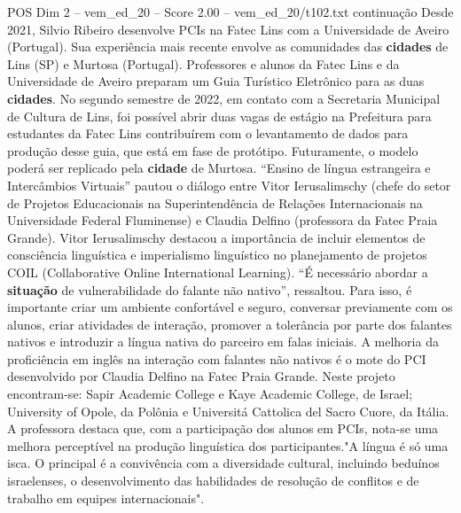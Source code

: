 \begin{textsample}{POS Dim 2 – vem\_ed\_20 – Score 2.00 – vem\_ed\_20/t102.txt}  \label{ex:f2_pos_104}
continuação Desde 2021, Silvio Ribeiro desenvolve PCIs na Fatec Lins com a Universidade de Aveiro (Portugal).
Sua experiência mais recente envolve as comunidades das \textbf{cidades} de Lins (SP) e Murtosa (Portugal).
Professores e alunos da Fatec Lins e da Universidade de Aveiro preparam um Guia Turístico Eletrônico para as duas \textbf{cidades}.
No segundo semestre de 2022, em contato com a Secretaria Municipal de Cultura de Lins, foi possível abrir duas vagas de estágio na Prefeitura para estudantes da Fatec Lins contribuírem com o levantamento de dados para produção desse guia, que está em fase de protótipo.
Futuramente, o modelo poderá ser replicado pela \textbf{cidade} de Murtosa. “Ensino de língua estrangeira e Intercâmbios Virtuais” pautou o diálogo entre Vitor Ierusalimschy (chefe do setor de Projetos Educacionais na Superintendência de Relações Internacionais na Universidade Federal Fluminense) e Claudia Delfino (professora da Fatec Praia Grande).
Vitor Ierusalimschy destacou a importância de incluir elementos de consciência linguística e imperialismo linguístico no planejamento de projetos COIL (Collaborative Online International Learning). “É necessário abordar a \textbf{situação} de vulnerabilidade do falante não nativo”, ressaltou.
Para isso, é importante criar um ambiente confortável e seguro, conversar previamente com os alunos, criar atividades de interação, promover a tolerância por parte dos falantes nativos e introduzir a língua nativa do parceiro em falas iniciais.
A melhoria da proficiência em inglês na interação com falantes não nativos é o mote do PCI desenvolvido por Claudia Delfino na Fatec Praia Grande.
Neste projeto encontram-se: Sapir Academic College e Kaye Academic College, de Israel; University of Opole, da Polônia e Universitá Cattolica del Sacro Cuore, da Itália.
A professora destaca que, com a participação dos alunos em PCIs, nota-se uma melhora perceptível na produção linguística dos participantes."A língua é só uma isca.
O principal é a convivência com a diversidade cultural, incluindo beduínos israelenses, o desenvolvimento das habilidades de resolução de conflitos e de trabalho em equipes internacionais".

\end{textsample}
